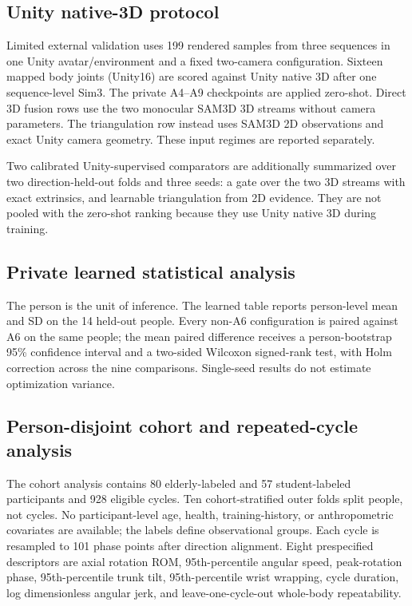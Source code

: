 \subsection{Unity native-3D protocol}

Limited external validation uses 199 rendered samples from three sequences in
one Unity avatar/environment and a fixed two-camera configuration. Sixteen
mapped body joints (Unity16) are scored against Unity native 3D after one
sequence-level Sim3. The private A4--A9 checkpoints are applied zero-shot.
Direct 3D fusion rows use the two monocular SAM3D 3D streams without camera
parameters. The triangulation row instead uses SAM3D 2D observations and exact
Unity camera geometry. These input regimes are reported separately.

Two calibrated Unity-supervised comparators are additionally summarized over
two direction-held-out folds and three seeds: a gate over the two 3D streams
with exact extrinsics, and learnable triangulation from 2D evidence. They are
not pooled with the zero-shot ranking because they use Unity native 3D during
training.

\subsection{Private learned statistical analysis}

The person is the unit of inference. The learned table reports person-level
mean and SD on the 14 held-out people. Every non-A6 configuration is paired
against A6 on the same people; the mean paired difference receives a
person-bootstrap 95\% confidence interval and a two-sided Wilcoxon signed-rank
test, with Holm correction across the nine comparisons. Single-seed results do
not estimate optimization variance.

\subsection{Person-disjoint cohort and repeated-cycle analysis}
\label{sec:cohort-cycle-methods}

The cohort analysis contains 80 elderly-labeled and 57 student-labeled
participants and 928 eligible cycles. Ten cohort-stratified outer folds split
people, not cycles. No participant-level age, health, training-history, or
anthropometric covariates are available; the labels define observational groups.
Each cycle is resampled to 101 phase points after direction alignment. Eight
prespecified descriptors are axial rotation ROM, 95th-percentile angular speed,
peak-rotation phase, 95th-percentile trunk tilt, 95th-percentile wrist wrapping,
cycle duration, log dimensionless angular jerk, and leave-one-cycle-out
whole-body repeatability.

